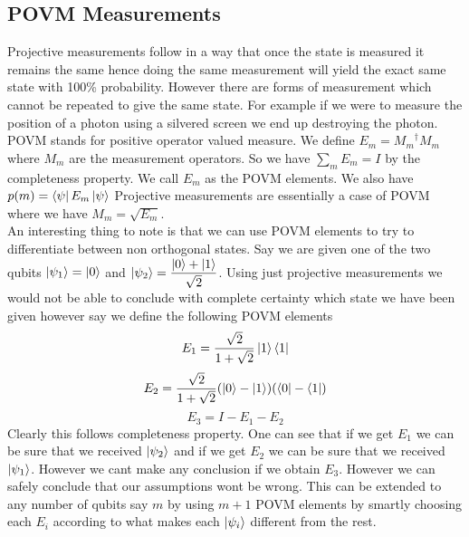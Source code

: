 \documentclass{report}
\begin{document}
\subsection{POVM Measurements}
Projective measurements follow in a way that once the state is measured it remains the same hence doing the same measurement will yield the exact same state with 100\% probability. 
However there are forms of measurement which cannot be repeated to give the same state. For example if we were to measure the position of a photon using a silvered screen we end up destroying the photon.\\
POVM stands for positive operator valued measure. We define $E_m = {M_m}^{\dagger}M_m$ where $M_m$ are the measurement operators. So we have $\sum_m{E_m} = I$ by the completeness property. We call $E_m$ as the POVM elements. We also have $p(m) = \bra{\psi}E_m\ket{\psi}$
Projective measurements are essentially a case of POVM where we have $M_m = \sqrt{E_m}$.\\
An interesting thing to note is that we can use POVM elements to try to differentiate between non orthogonal states. Say we are given one of the two qubits $\ket{\psi_1} = \ket{0}$ and $\ket{\psi_2} = \dfrac{\ket{0} + \ket{1}}{\sqrt{2}}$. Using just projective measurements we would not be able to conclude with complete certainty which state we have been given however say we define the following POVM elements
$$E_1 = \dfrac{\sqrt{2}}{1 + \sqrt{2}}\ket{1}\bra{1}$$
$$E_2 = \dfrac{\sqrt{2}}{1 + \sqrt{2}}(\ket{0} - \ket{1})(\bra{0} - \bra{1})$$
$$E_3 = I - E_1 - E_2$$
Clearly this follows completeness property. One can see that if we get $E_1$ we can be sure that we received $\ket{\psi_2}$ and if we get $E_2$ we can be sure that we received $\ket{\psi_1}$. However we cant make any conclusion if we obtain $E_3$. However we can safely conclude that our assumptions wont be wrong.
This can be extended to any number of qubits say $m$ by using $m + 1$ POVM elements by smartly choosing each $E_i$ according to what makes each $\ket{\psi_i}$ different from the rest. 
\end{document}
